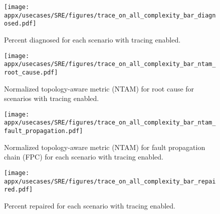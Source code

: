 \begin{figure*}
    \texttt{[image: appx/usecases/SRE/figures/trace\_on\_all\_complexity\_bar\_diagnosed.pdf]}
    \caption{\label{fig:sre:trace_on_diagnosis_pass1} Percent diagnosed for each scenario with tracing enabled.}
\end{figure*}

\begin{figure*}
    \texttt{[image: appx/usecases/SRE/figures/trace\_on\_all\_complexity\_bar\_ntam\_root\_cause.pdf]}
    \caption{\label{fig:sre:trace_on_ntam_rc} Normalized topology-aware metric (NTAM) for root cause for scenarios with tracing enabled.}
\end{figure*}

\begin{figure*}
    \texttt{[image: appx/usecases/SRE/figures/trace\_on\_all\_complexity\_bar\_ntam\_fault\_propagation.pdf]}
    \caption{\label{fig:sre:trace_on_ntam_fpc} Normalized topology-aware metric (NTAM) for fault propagation chain (FPC) for each scenario with tracing enabled.}
\end{figure*}

\begin{figure*}
    \texttt{[image: appx/usecases/SRE/figures/trace\_on\_all\_complexity\_bar\_repaired.pdf]}
    \caption{\label{fig:sre:trace_on_repair_pass1}Percent repaired for each scenario with tracing enabled.}
\end{figure*}









